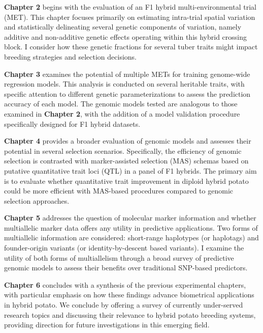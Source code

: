 \begin{refsection}
\textbf{Chapter 2} begins with the evaluation of an F1 hybrid
multi-environmental trial (MET). This chapter focuses primarily on
estimating intra-trial spatial variation and statistically delineating
several genetic components of variation, namely additive and
non-additive genetic effects operating within this hybrid crossing
block. I consider how these genetic fractions for several tuber traits
might impact breeding strategies and selection decisions.

\textbf{Chapter 3} examines the potential of multiple METs for training
genome-wide regression models. This analysis is conducted on several
heritable traits, with specific attention to different genetic
parameterizations to assess the prediction accuracy of each model. The
genomic models tested are analogous to those examined in \textbf{Chapter
2}, with the addition of a model validation procedure specifically
designed for F1 hybrid datasets.

\textbf{Chapter 4} provides a broader evaluation of genomic models and
assesses their potential in several selection scenarios. Specifically,
the efficiency of genomic selection is contrasted with marker-assisted
selection (MAS) schemas based on putative quantitative trait loci (QTL)
in a panel of F1 hybrids. The primary aim is to evaluate whether
quantitative trait improvement in diploid hybrid potato could be more
efficient with MAS-based procedures compared to genomic selection
approaches.

\textbf{Chapter 5} addresses the question of molecular marker
information and whether multiallelic marker data offers any utility in
predictive applications. Two forms of multiallelic information are
considered: short-range haplotypes (or haplotags) and founder-origin
variants (or identity-by-descent based variants). I examine the utility
of both forms of multiallelism through a broad survey of predictive
genomic models to assess their benefits over traditional SNP-based
predictors.

\textbf{Chapter 6} concludes with a synthesis of the previous
experimental chapters, with particular emphasis on how these findings
advance biometrical applications in hybrid potato. We conclude by
offering a survey of currently under-served research topics and
discussing their relevance to hybrid potato breeding systems, providing
direction for future investigations in this emerging field.


\printbibliography[heading=chapterbib, resetnumbers=true]

\end{refsection}


